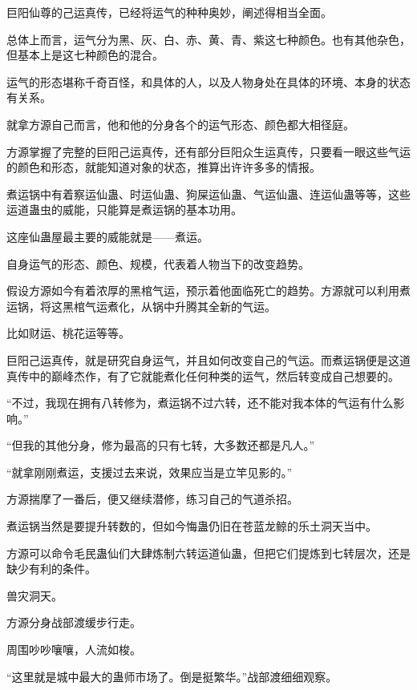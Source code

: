 
\begin{this_body}



巨阳仙尊的己运真传，已经将运气的种种奥妙，阐述得相当全面。

总体上而言，运气分为黑、灰、白、赤、黄、青、紫这七种颜色。也有其他杂色，但基本上是这七种颜色的混合。

运气的形态堪称千奇百怪，和具体的人，以及人物身处在具体的环境、本身的状态有关系。

就拿方源自己而言，他和他的分身各个的运气形态、颜色都大相径庭。

方源掌握了完整的巨阳己运真传，还有部分巨阳众生运真传，只要看一眼这些气运的颜色和形态，就能知道对象的状态，推算出许许多多的情报。

煮运锅中有着察运仙蛊、时运仙蛊、狗屎运仙蛊、气运仙蛊、连运仙蛊等等，这些运道蛊虫的威能，只能算是煮运锅的基本功用。

这座仙蛊屋最主要的威能就是——煮运。

自身运气的形态、颜色、规模，代表着人物当下的改变趋势。

假设方源如今有着浓厚的黑棺气运，预示着他面临死亡的趋势。方源就可以利用煮运锅，将这黑棺气运煮化，从锅中升腾其全新的气运。

比如财运、桃花运等等。

巨阳己运真传，就是研究自身运气，并且如何改变自己的气运。而煮运锅便是这道真传中的巅峰杰作，有了它就能煮化任何种类的运气，然后转变成自己想要的。

“不过，我现在拥有八转修为，煮运锅不过六转，还不能对我本体的气运有什么影响。”

“但我的其他分身，修为最高的只有七转，大多数还都是凡人。”

“就拿刚刚煮运，支援过去来说，效果应当是立竿见影的。”

方源揣摩了一番后，便又继续潜修，练习自己的气道杀招。

煮运锅当然是要提升转数的，但如今悔蛊仍旧在苍蓝龙鲸的乐土洞天当中。

方源可以命令毛民蛊仙们大肆炼制六转运道仙蛊，但把它们提炼到七转层次，还是缺少有利的条件。

兽灾洞天。

方源分身战部渡缓步行走。

周围吵吵嚷嚷，人流如梭。

“这里就是城中最大的蛊师市场了。倒是挺繁华。”战部渡细细观察。


\end{this_body}
